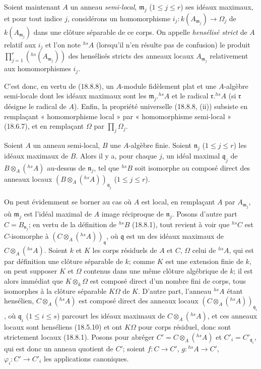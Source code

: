 \begin{env}[18.8.9]
Soient maintenant $A$ un anneau \emph{semi-local}, $\mathfrak m_j$ ($1\leq j\leq r$) ses idéaux maximaux, et pour tout indice $j$, considérons un homomorphisme $i_j:k(A_{\mathfrak m_j})\to\Omega_j$ de $k(A_{\mathfrak m_j})$ dans une clôture séparable de ce corps. On appelle \emph{hensélisé strict} de $A$ relatif aux $i_j$ et l'on note ${}^{hs}\!A$ (lorsqu'il n'en résulte pas de confusion) le produit $\prod_{j=1}^r({}^{hs}(A_{\mathfrak m_j}))$ des hensélisés stricts des anneaux locaux $A_{\mathfrak m_j}$ relativement aux homomorphismes $i_j$.


C'est donc, en vertu de (18.8.8), un $A$-module fidèlement plat et une $A$-algèbre semi-locale dont les idéaux maximaux sont les $\mathfrak m_j.{}^{hs}\!A$ et le radical $\mathfrak r.{}^{hs}\!A$ (si $\mathfrak r$ désigne le radical de $A$). Enfin, la propriété universelle (18.8.8, (ii)) subsiste en remplaçant « homomorphisme local » par « homomorphisme semi-local » (18.6.7), et en remplaçant $\Omega$ par $\prod_j\Omega_j$.
\end{env}

\begin{proposition}[18.8.10]
\label{IV.18.8.10}
Soient $A$ un anneau semi-local, $B$ une $A$-algèbre finie. Soient $\mathfrak n_j$ ($1\leq j\leq r$) les idéaux maximaux de $B$. Alors il y a, pour chaque $j$, un idéal maximal $\mathfrak q_j$ de $B\otimes_A({}^{hs}\!A)$ au-dessus de $\mathfrak n_j$, tel que ${}^{hs}\!B$ soit isomorphe au composé direct des anneaux locaux $(B\otimes_A({}^{hs}\!A))_{\mathfrak q_j}$ ($1\leq j\leq r$).
\end{proposition}

On peut évidemment se borner au cas où $A$ est local, en remplaçant $A$ par $A_{\mathfrak m_j}$, où $\mathfrak m_j$ est l'idéal maximal de $A$ image réciproque de $\mathfrak n_j$. Posons d'autre part $C=B_{\mathfrak n_j}$; en vertu de la définition de ${}^{hs}\!B$ (18.8.1), tout revient à voir que ${}^{hs}\!C$ est $C$-isomorphe à $(C\otimes_A({}^{hs}\!A))_{\mathfrak q}$, où $\mathfrak q$ est un des idéaux maximaux de $C\otimes_A({}^{hs}\!A)$. Soient $k$ et $K$ les corps résiduels de $A$ et $C$, $\Omega$ celui de ${}^{hs}\!A$, qui est par définition une clôture séparable de $k$; comme $K$ est une extension finie de $k$, on peut supposer $K$ et $\Omega$ contenus dans une même clôture algébrique de $k$; il est alors immédiat que $K\otimes_k\Omega$ est composé direct d'un nombre fini de corps, tous isomorphes à la clôture séparable $K\Omega$ de $K$. D'autre part, l'anneau ${}^{hs}\!A$ étant hensélien, $C\otimes_A({}^{hs}\!A)$ est composé direct des anneaux locaux $(C\otimes_A({}^{hs}\!A))_{\mathfrak q_i}$, où $\mathfrak q_i$ ($1\leq i\leq s$) parcourt les idéaux maximaux de $C\otimes_A({}^{hs}\!A)$, et ces anneaux locaux sont henséliens (18.5.10) et ont $K\Omega$ pour corps résiduel, donc sont strictement locaux (18.8.1). Posons pour abréger $C'=C\otimes_A({}^{hs}\!A)$ et $C'_i=C'_{\mathfrak q_i}$, qui est donc un anneau quotient de $C'$; soient $f:C\to C'$, $g:{}^{hs}\!A\to C'$, $\varphi_i:C'\to C'_i$ les applications canoniques.

